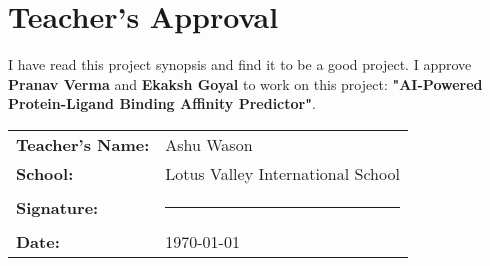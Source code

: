 \documentclass[12pt,a4paper]{article}
\begin{document}
\vspace{1cm}

\section*{Teacher's Approval}

\noindent I have read this project synopsis and find it to be a good project. I approve \textbf{Pranav Verma} and \textbf{Ekaksh Goyal} to work on this project: \textbf{"AI-Powered Protein-Ligand Binding Affinity Predictor"}.

\vspace{1cm}

\begin{tabular}{ll}
\textbf{Teacher's Name:} & Ashu Wason \\
\textbf{School:} & Lotus Valley International School \\
\textbf{Signature:} & \rule{5cm}{0.4pt} \\
\textbf{Date:} & \today
\end{tabular}
\end{document}
